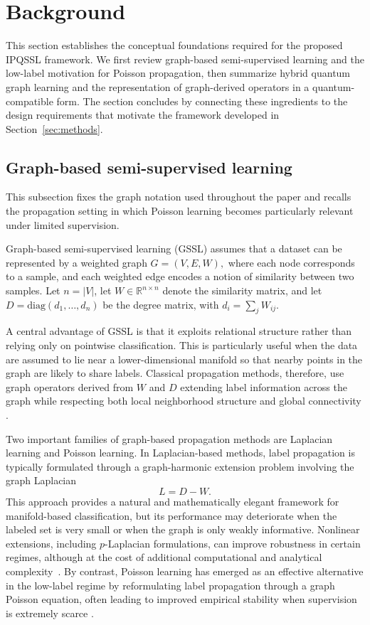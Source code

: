\documentclass[11pt,a4paper]{article}
\begin{document}
\section{Background}\label{sec:background}

This section establishes the conceptual foundations required for the proposed
\textsc{IPQSSL} framework. We first review graph-based semi-supervised learning
and the low-label motivation for Poisson propagation, then summarize hybrid
quantum graph learning and the representation of graph-derived operators in a
quantum-compatible form. The section concludes by connecting these ingredients
to the design requirements that motivate the framework developed in
Section~\ref{sec:methods}.

\subsection{Graph-based semi-supervised learning}\label{subsec:gssl}

This subsection fixes the graph notation used throughout the paper and recalls
the propagation setting in which Poisson learning becomes particularly relevant
under limited supervision.

Graph-based semi-supervised learning (GSSL) assumes that a dataset can be represented by a weighted graph
\(
G=(V,E,W),
\)
where each node corresponds to a sample, and each weighted edge encodes a notion of similarity between two samples. Let \(n=|V|\), let \(W\in\mathbb{R}^{n\times n}\) denote the similarity matrix, and let
\(
D=\mathrm{diag}(d_1,\dots,d_n)
\)
be the degree matrix, with
\(
d_i=\sum_j W_{ij}.
\)


A central advantage of GSSL is that it exploits relational structure rather than relying only on pointwise classification. This is particularly useful when the data are assumed to lie near a lower-dimensional manifold so that nearby points in the graph are likely to share labels. Classical propagation methods, therefore, use graph operators derived from \(W\) and \(D\) extending label information across the graph while respecting both local neighborhood structure and global connectivity \cite{yang2013saliency,calder2020poisson}.

Two important families of graph-based propagation methods are Laplacian learning and Poisson learning. In Laplacian-based methods, label propagation is typically formulated through a graph-harmonic extension problem involving the graph Laplacian
\[
L=D-W.
\]
This approach provides a natural and mathematically elegant framework for manifold-based classification, but its performance may deteriorate when the labeled set is very small or when the graph is only weakly informative. Nonlinear extensions, including \(p\)-Laplacian formulations, can improve robustness in certain regimes, although at the cost of additional computational and analytical complexity~\cite{elalaoui2016plap}. By contrast, Poisson learning has emerged as an effective alternative in the low-label regime by reformulating label propagation through a graph Poisson equation, often leading to improved empirical stability when supervision is extremely scarce \cite{calder2020poisson}.
\end{document}

